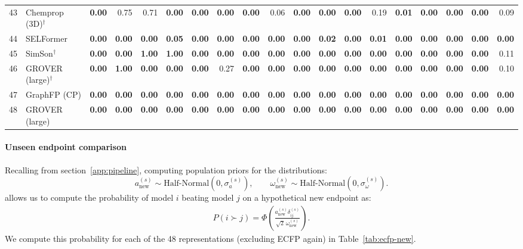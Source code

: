 \documentclass{article}
\begin{document}
\begin{table}[H]
{\begin{tabular}{@{}rlrrrrrrrrrrrrrrrrr@{}}
43 & Chemprop (3D)$^\dagger$ & \textbf{0.00} & 0.75 & 0.71 & \textbf{0.00} & \textbf{0.00} & \textbf{0.00} & \textbf{0.00} & 0.06 & \textbf{0.00} & \textbf{0.00} & \textbf{0.00} & 0.19 & \textbf{0.01} & \textbf{0.00} & \textbf{0.00} & \textbf{0.00} & 0.09 \\
44 & SELFormer & \textbf{0.00} & \textbf{0.00} & \textbf{0.00} & \textbf{0.05} & \textbf{0.00} & \textbf{0.00} & \textbf{0.00} & \textbf{0.00} & \textbf{0.00} & \textbf{0.02} & \textbf{0.00} & \textbf{0.01} & \textbf{0.00} & \textbf{0.00} & \textbf{0.00} & \textbf{0.00} & \textbf{0.00} \\
45 & SimSon$^\dagger$ & \textbf{0.00} & \textbf{0.00} & \textbf{1.00} & \textbf{1.00} & \textbf{0.00} & \textbf{0.00} & \textbf{0.00} & \textbf{0.00} & \textbf{0.00} & \textbf{0.00} & \textbf{0.00} & \textbf{0.00} & \textbf{0.00} & \textbf{0.00} & \textbf{0.00} & \textbf{0.00} & 0.11 \\
46 & GROVER (large)$^\dagger$ & \textbf{0.00} & \textbf{1.00} & \textbf{0.00} & \textbf{0.00} & \textbf{0.00} & 0.27 & \textbf{0.00} & \textbf{0.00} & \textbf{0.00} & \textbf{0.00} & \textbf{0.00} & \textbf{0.00} & \textbf{0.00} & \textbf{0.00} & \textbf{0.00} & \textbf{0.00} & 0.10 \\
47 & GraphFP (CP) & \textbf{0.00} & \textbf{0.00} & \textbf{0.00} & \textbf{0.00} & \textbf{0.00} & \textbf{0.00} & \textbf{0.00} & \textbf{0.00} & \textbf{0.00} & \textbf{0.00} & \textbf{0.00} & \textbf{0.00} & \textbf{0.00} & \textbf{0.00} & \textbf{0.00} & \textbf{0.00} & \textbf{0.00} \\
48 & GROVER (large) & \textbf{0.00} & \textbf{0.00} & \textbf{0.00} & \textbf{0.00} & \textbf{0.00} & \textbf{0.00} & \textbf{0.00} & \textbf{0.00} & \textbf{0.00} & \textbf{0.00} & \textbf{0.00} & \textbf{0.00} & \textbf{0.00} & \textbf{0.00} & \textbf{0.00} & \textbf{0.00} & \textbf{0.00} \\
\bottomrule
\end{tabular}}
\end{table}

\paragraph{Unseen endpoint comparison} Recalling from section~\ref{app:pipeline}, computing population priors for the distributions:
\begin{equation}
    a_{\text{new}}^{(s)} \sim \text{Half-Normal}(0, \sigma_a^{(s)}), \qquad
    \omega_{\text{new}}^{(s)} \sim \text{Half-Normal}(0, \sigma_\omega^{(s)}).
\end{equation}
allows us to compute the probability of model $i$ beating model $j$ on a hypothetical new endpoint as:
\begin{gather}
    P(i \succ j) = \Phi\!\left(\frac{a_{\text{new}}^{(s)}\delta_{ij}^{(s)}}{\sqrt{2}\,\omega_{\text{new}}^{(s)}}\right).
\end{gather}
We compute this probability for each of the 48 representations (excluding ECFP again) in Table~\ref{tab:ecfp-new}.
\end{document}

